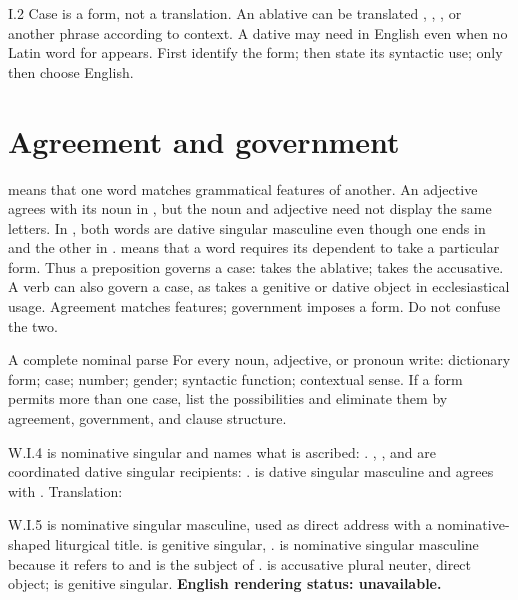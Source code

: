 \begin{courseunit}{I.2}
Case is a form, not a translation. An ablative can be translated
, , , or another phrase according to
context. A dative may need  in English even when no Latin word for
 appears. First identify the form; then state its syntactic use;
only then choose English.

\section{Agreement and government}

 means that one word matches grammatical features of another.
An adjective agrees with its noun in , but the
noun and adjective need not display the same letters. In , both words are dative singular masculine even though one ends in
 and the other in .  means that a word
requires its dependent to take a particular form. Thus a preposition governs a
case:  takes the ablative;  takes the accusative. A verb
can also govern a case, as  takes a genitive or dative object
in ecclesiastical usage. Agreement matches features; government imposes a
form. Do not confuse the two.

\begin{grammarbox}{A complete nominal parse}
For every noun, adjective, or pronoun write: dictionary form; case; number;
gender; syntactic function; contextual sense. If a form permits more than one
case, list the possibilities and eliminate them by agreement, government, and
clause structure.
\end{grammarbox}

\begin{workedexample}{}{W.I.4}
 is nominative singular and names what is ascribed: .
, , and  are coordinated dative
singular recipients: .
 is dative singular masculine and agrees with .
Translation: 
\end{workedexample}

\begin{workedexample}{}{W.I.5}
 is nominative singular masculine, used as direct address with a
nominative-shaped liturgical title.  is genitive singular,
.  is nominative singular masculine because it
refers to  and is the subject of . 
is accusative plural neuter, direct object;  is genitive singular.
\textbf{English rendering status: unavailable.}
\end{workedexample}


\end{courseunit}
